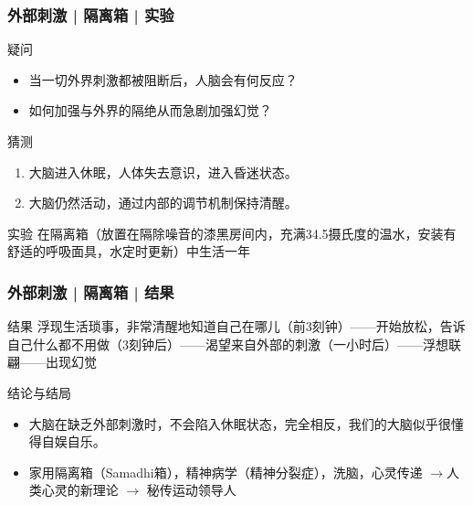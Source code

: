 \begin{frame}
  \frametitle{外部刺激 | 隔离箱 | 实验}
  \begin{block}{疑问}
    \begin{itemize}
      \item 当一切外界刺激都被阻断后，人脑会有何反应？
      \item 如何加强与外界的隔绝从而急剧加强幻觉？
    \end{itemize}
  \end{block}
  \pause
  \begin{block}{猜测}
    \begin{enumerate}
      \item 大脑进入休眠，人体失去意识，进入昏迷状态。
      \item 大脑仍然活动，通过内部的调节机制保持清醒。
    \end{enumerate}
  \end{block}
  \pause
  \begin{block}{实验}
      在隔离箱（放置在隔除噪音的漆黑房间内，充满34.5摄氏度的温水，安装有舒适的呼吸面具，水定时更新）中生活一年
  \end{block}
\end{frame}

\begin{frame}
  \frametitle{外部刺激 | 隔离箱 | 结果}
  \begin{block}{结果}
浮现生活琐事，非常清醒地知道自己在哪儿（前3刻钟）——开始放松，告诉自己什么都不用做（3刻钟后）——渴望来自外部的刺激（一小时后）——浮想联翩——出现幻觉
  \end{block}
  \pause
  \begin{block}{结论与结局}
    \begin{itemize}
      \item 大脑在缺乏外部刺激时，不会陷入休眠状态，完全相反，我们的大脑似乎很懂得自娱自乐。
      \item 家用隔离箱（Samadhi箱），精神病学（精神分裂症），洗脑，心灵传递 $\rightarrow$人类心灵的新理论 $\rightarrow$ 秘传运动领导人
    \end{itemize}
  \end{block}
\end{frame}

